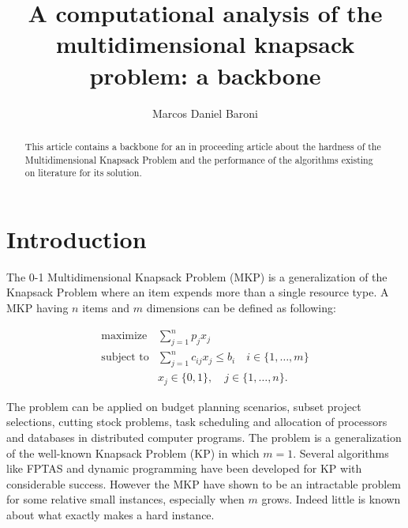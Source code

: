 \documentclass{article}
\title{A computational analysis of the multidimensional knapsack problem: a backbone}
\author{Marcos Daniel Baroni}
\begin{document}
%
%

\maketitle

\begin{abstract}
This article contains a backbone for an in proceeding article about the
hardness of the Multidimensional Knapsack Problem and the performance of
the algorithms existing on literature for its solution.
\end{abstract}

\section{Introduction}
\label{intro}


The 0-1 Multidimensional Knapsack Problem (MKP) is a generalization of the Knapsack
Problem where an item expends more than a single resource type.
A MKP having $n$ items and $m$ dimensions can be defined as following:

\begin{align*}
  \text{maximize} & \sum_{j=1}^n p_j x_j \\
  \text{subject to} & \sum_{j=1}^n c_{ij} x_j \leq b_i \quad i \in \{1, \ldots, m\}\\
   & x_j \in \{0, 1\}, \quad j \in \{1, \ldots, n\}.
\end{align*}

The problem can be applied on budget planning scenarios, subset project
selections, cutting stock problems, task scheduling and allocation of processors
and databases in distributed computer programs.
The problem is a generalization of the well-known Knapsack Problem (KP) in which
$ m = 1$.
Several algorithms like FPTAS and dynamic programming have been developed for
KP with considerable success.
However the MKP have shown to be an intractable problem for some relative small
instances, especially when $m$ grows.
Indeed little is known about what exactly makes a hard instance.
\end{document}
